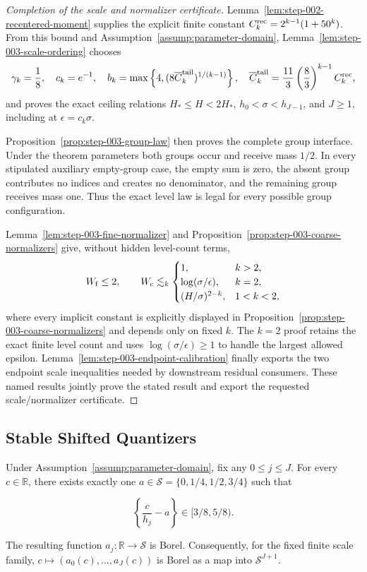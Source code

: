 \begin{proof}[Completion of the scale and normalizer certificate]
Lemma~\ref{lem:step-002-recentered-moment} supplies the explicit
finite constant \(C_k^{\rm rec}=2^{k-1}(1+50^k)\). From this bound and
Assumption~\ref{assump:parameter-domain},
Lemma~\ref{lem:step-003-scale-ordering} chooses
\[
\gamma_k=\frac18,
\quad
c_k=e^{-1},
\quad
b_k=\max\left\{4,
  (8\overline C_k^{\rm tail})^{1/(k-1)}
\right\},
\quad
\overline C_k^{\rm tail}
=\frac{11}{3}\left(\frac83\right)^{k-1}C_k^{\rm rec},
\]
and proves the exact ceiling relations \(H_*\leq H<2H_*\),
\(h_0<\sigma<h_{J-1}\), and \(J\geq1\), including at
\(\epsilon=c_k\sigma\).

Proposition~\ref{prop:step-003-group-law} then proves the complete group
interface. Under the theorem parameters both groups occur and receive mass
\(1/2\). In every stipulated auxiliary empty-group case, the empty sum is zero,
the absent group contributes no indices and creates no denominator, and the
remaining group receives mass one. Thus the exact level law is legal for
every possible group configuration.

Lemma~\ref{lem:step-003-fine-normalizer} and
Proposition~\ref{prop:step-003-coarse-normalizers} give, without hidden
level-count terms,
\[
W_{\rm f}\leq2,
\qquad
W_{\rm c}\lesssim_k
\begin{cases}
1,&k>2,\\
\log(\sigma/\epsilon),&k=2,\\
(H/\sigma)^{2-k},&1<k<2,
\end{cases}
\]
where every implicit constant is explicitly displayed in
Proposition~\ref{prop:step-003-coarse-normalizers} and depends only on
fixed \(k\). The \(k=2\) proof retains the exact finite level count and uses
\(\log(\sigma/\epsilon)\geq1\) to handle the largest allowed epsilon.
Lemma~\ref{lem:step-003-endpoint-calibration} finally exports the two
endpoint scale inequalities needed by downstream residual consumers. These
named results jointly prove the stated result and export the
requested scale/normalizer certificate.
\end{proof}

\subsection{Stable Shifted Quantizers}\label{app:step-004}

\begin{lemma}\label{lem:step-004-four-arc-selector}
Under Assumption~\ref{assump:parameter-domain}, fix any \(0\le j\le J\). For every \(c\in\mathbb R\), there exists exactly one \(a\in\mathcal S=\{0,1/4,1/2,3/4\}\) such that

\[
\left\{\frac{c}{h_j}-a\right\}\in[3/8,5/8).
\]

The resulting function \(a_j:\mathbb R\to\mathcal S\) is Borel. Consequently, for the fixed finite scale family, \(c\mapsto(a_0(c),\ldots,a_J(c))\) is Borel as a map into \(\mathcal S^{J+1}\).
\end{lemma}


